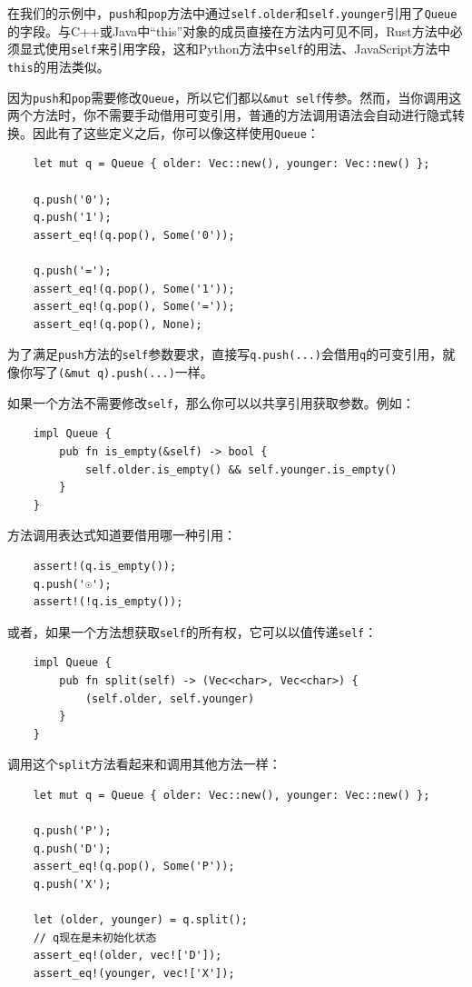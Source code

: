 在我们的示例中，\texttt{push}和\texttt{pop}方法中通过\texttt{self.older}和\texttt{self.younger}引用了\texttt{Queue}的字段。与C++或Java中“this”对象的成员直接在方法内可见不同，Rust方法中必须显式使用\texttt{self}来引用字段，这和Python方法中\texttt{self}的用法、JavaScript方法中\texttt{this}的用法类似。

因为\texttt{push}和\texttt{pop}需要修改\texttt{Queue}，所以它们都以\texttt{\&mut self}传参。然而，当你调用这两个方法时，你不需要手动借用可变引用，普通的方法调用语法会自动进行隐式转换。因此有了这些定义之后，你可以像这样使用\texttt{Queue}：
\begin{verbatim}
    let mut q = Queue { older: Vec::new(), younger: Vec::new() };

    q.push('0');
    q.push('1');
    assert_eq!(q.pop(), Some('0'));

    q.push('=');
    assert_eq!(q.pop(), Some('1'));
    assert_eq!(q.pop(), Some('='));
    assert_eq!(q.pop(), None);
\end{verbatim}

为了满足\texttt{push}方法的\texttt{self}参数要求，直接写\texttt{q.push(...)}会借用\texttt{q}的可变引用，就像你写了\texttt{(\&mut q).push(...)}一样。

如果一个方法不需要修改\texttt{self}，那么你可以以共享引用获取参数。例如：
\begin{verbatim}
    impl Queue {
        pub fn is_empty(&self) -> bool {
            self.older.is_empty() && self.younger.is_empty()
        }
    }
\end{verbatim}

方法调用表达式知道要借用哪一种引用：
\begin{verbatim}
    assert!(q.is_empty());
    q.push('☉');
    assert!(!q.is_empty());
\end{verbatim}

或者，如果一个方法想获取\texttt{self}的所有权，它可以以值传递\texttt{self}：
\begin{verbatim}
    impl Queue {
        pub fn split(self) -> (Vec<char>, Vec<char>) {
            (self.older, self.younger)
        }
    }
\end{verbatim}

调用这个\texttt{split}方法看起来和调用其他方法一样：
\begin{verbatim}
    let mut q = Queue { older: Vec::new(), younger: Vec::new() };

    q.push('P');
    q.push('D');
    assert_eq!(q.pop(), Some('P'));
    q.push('X');

    let (older, younger) = q.split();
    // q现在是未初始化状态
    assert_eq!(older, vec!['D']);
    assert_eq!(younger, vec!['X']);
\end{verbatim}

